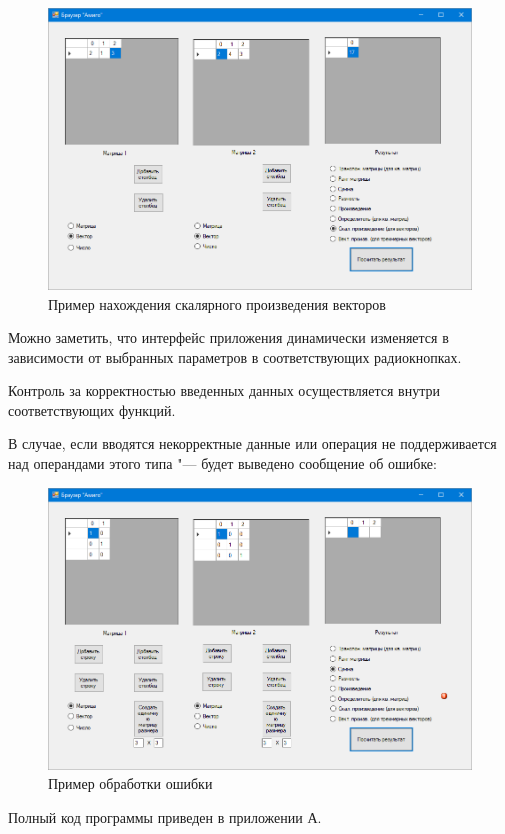 \begin{figure}[H]
    \centering
    \includegraphics[scale=0.4]{task6/scalar.png}
    \caption{Пример нахождения скалярного произведения векторов}
\end{figure}

Можно заметить, что интерфейс приложения динамически изменяется в 
зависимости от выбранных параметров в соответствующих радиокнопках.

Контроль за корректностью введенных данных осуществляется внутри соответствующих
функций. 

В случае, если вводятся некорректные данные или операция не поддерживается
над операндами этого типа "--- будет выведено сообщение об ошибке:
\begin{figure}[H]
    \centering
    \includegraphics[scale=0.4]{task6/error1.png}
    \caption{Пример обработки ошибки}
\end{figure}
Полный код программы приведен в приложении А.

